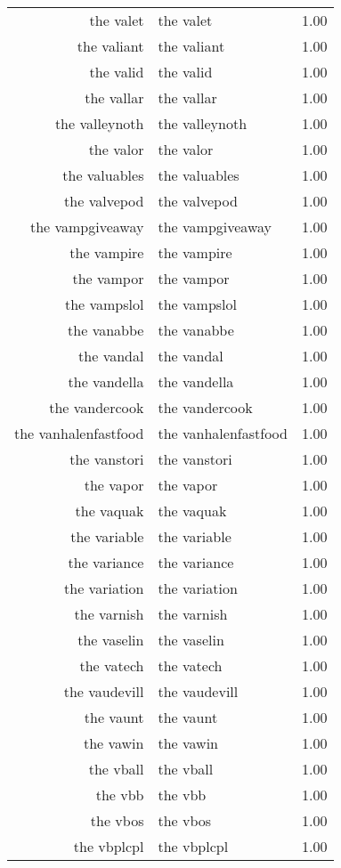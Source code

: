 \begin{table}[ht]
\begin{tabular}{rlr}
  the valet & the valet & 1.00 \\ 
  the valiant & the valiant & 1.00 \\ 
  the valid & the valid & 1.00 \\ 
  the vallar & the vallar & 1.00 \\ 
  the valleynoth & the valleynoth & 1.00 \\ 
  the valor & the valor & 1.00 \\ 
  the valuables & the valuables & 1.00 \\ 
  the valvepod & the valvepod & 1.00 \\ 
  the vampgiveaway & the vampgiveaway & 1.00 \\ 
  the vampire & the vampire & 1.00 \\ 
  the vampor & the vampor & 1.00 \\ 
  the vampslol & the vampslol & 1.00 \\ 
  the vanabbe & the vanabbe & 1.00 \\ 
  the vandal & the vandal & 1.00 \\ 
  the vandella & the vandella & 1.00 \\ 
  the vandercook & the vandercook & 1.00 \\ 
  the vanhalenfastfood & the vanhalenfastfood & 1.00 \\ 
  the vanstori & the vanstori & 1.00 \\ 
  the vapor & the vapor & 1.00 \\ 
  the vaquak & the vaquak & 1.00 \\ 
  the variable & the variable & 1.00 \\ 
  the variance & the variance & 1.00 \\ 
  the variation & the variation & 1.00 \\ 
  the varnish & the varnish & 1.00 \\ 
  the vaselin & the vaselin & 1.00 \\ 
  the vatech & the vatech & 1.00 \\ 
  the vaudevill & the vaudevill & 1.00 \\ 
  the vaunt & the vaunt & 1.00 \\ 
  the vawin & the vawin & 1.00 \\ 
  the vball & the vball & 1.00 \\ 
  the vbb & the vbb & 1.00 \\ 
  the vbos & the vbos & 1.00 \\ 
  the vbplcpl & the vbplcpl & 1.00 \\ 

\end{tabular}
\end{table}
